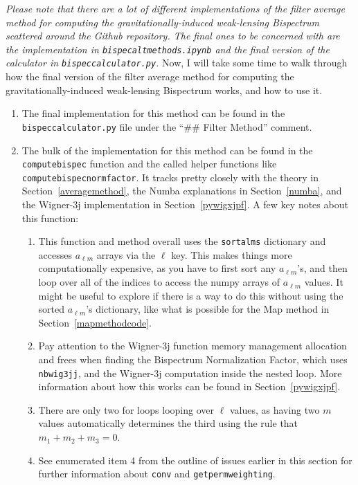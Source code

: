 \documentclass[11pt]{article}
\renewcommand{\_}[1]{\underline{ #1 }}
\newcommand{\npar}{\vspace{.3cm}\newline}
\newcommand{\us}{\textunderscore}
\begin{document}
{\textit{Please note that there are a lot of different implementations of the filter average method for computing the gravitationally-induced weak-lensing Bispectrum scattered around the Github repository. The final ones to be concerned with are the implementation in \texttt{bispec\us alt\us methods.ipynb} and the final version of the calculator in \texttt{bispec\us calculator.py}.}
\npar
Now, I will take some time to walk through how the final version of the filter average method for computing the gravitationally-induced weak-lensing Bispectrum works, and how to use it.
\begin{enumerate}
    \item The final implementation for this method can be found in the \texttt{bispec\us calculator.py} file under the ``\#\# Filter Method'' comment.
    \item The bulk of the implementation for this method can be found in the \texttt{compute\us bispec} function and the called helper functions like \texttt{compute\us bispec\us norm\us factor}. It tracks pretty closely with the theory in Section~\ref{averagemethod}, the Numba explanations in Section~\ref{numba}, and the Wigner-3j implementation in Section~\ref{pywigxjpf}. A few key notes about this function:
    \begin{enumerate}
        \item This function and method overall uses the \texttt{sort\us alms} dictionary and accesses $a_{\ell m}$ arrays via the $\ell$ key. This makes things more computationally expensive, as you have to first sort any $a_{\ell m}$'s, and then loop over all of the indices to access the numpy arrays of $a_{\ell m}$ values. It might be useful to explore if there is a way to do this without using the sorted $a_{\ell m}$'s dictionary, like what is possible for the Map method in Section~\ref{mapmethodcode}.
        \item Pay attention to the Wigner-3j function memory management allocation and frees when finding the Bispectrum Normalization Factor, which uses \texttt{nb\us wig3jj}, and the Wigner-3j computation inside the nested loop. More information about how this works can be found in Section~\ref{pywigxjpf}.
        \item There are only two for loops looping over $\ell$ values, as having two $m$ values automatically determines the third using the rule that $m_1 + m_2 + m_3 = 0$.
        \item See enumerated item 4 from the outline of issues earlier in this section for further information about \texttt{conv} and \texttt{get\us perm\us weighting}.

\end{enumerate}
\end{enumerate}}
\end{document}
